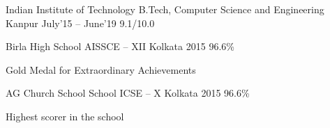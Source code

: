 


\begin{cventries}
  \smallcventry
  {Indian Institute of Technology}
  {B.Tech, Computer Science and Engineering}
  {Kanpur}
  {July'15 -- June'19}
  {9.1/10.0}
  {}
\end{cventries}
\begin{cventries}
  \smallcventry
  {Birla High School}
  {AISSCE -- XII}
  {Kolkata}
  {2015}
  {96.6\%}
  {
    \begin{cvitems}
    \item Gold Medal for Extraordinary Achievements
    \end{cvitems}
  }
\end{cventries}
\begin{cventries}
  \smallcventry
  {AG Church School School}
  {ICSE -- X}
  {Kolkata}
  {2015}
  {96.6\%}
  {
    \begin{cvitems}
    \item Highest scorer in the school
    \end{cvitems}
  }
\end{cventries}
\vspace{-2mm}
